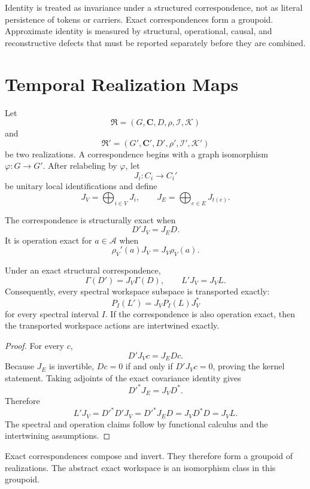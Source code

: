 Identity is treated as invariance under a structured correspondence, not as
literal persistence of tokens or carriers. Exact correspondences form a
groupoid. Approximate identity is measured by structural, operational,
causal, and reconstructive defects that must be reported separately before
they are combined.

\section{Temporal Realization Maps}

Let
\[
\mathfrak R=(G,\mathbf C,D,\rho,\mathcal I,\mathcal K)
\]
and
\[
\mathfrak R'=(G',\mathbf C',D',\rho',\mathcal I',\mathcal K')
\]
be two realizations. A correspondence begins with a graph isomorphism
\(\varphi:G\to G'\). After relabeling by \(\varphi\), let
\[
J_i:C_i\to C_i'
\]
be unitary local identifications and define
\[
J_V=\bigoplus_{i\in V}J_i,
\qquad
J_E=\bigoplus_{e\in E}J_{t(e)}.
\]

\begin{SRWTdefinition}\label{SRWT:def:exact-structural-correspondence}
The correspondence is structurally exact when
\[
\boxed{D'J_V=J_ED.}
\]
It is operation exact for \(a\in\mathcal A\) when
\[
\boxed{\rho_V'(a)J_V=J_V\rho_V(a).}
\]
\end{SRWTdefinition}

\begin{SRWTtheorem}\label{SRWT:thm:exact-replacement-isomorphism}
Under an exact structural correspondence,
\[
\boxed{
\Gamma(D')=J_V\Gamma(D),
\qquad
L'J_V=J_VL.
}
\]
Consequently, every spectral workspace subspace is transported exactly:
\[
P_I(L')=J_VP_I(L)J_V^*
\]
for every spectral interval \(I\). If the correspondence is also operation
exact, then the transported workspace actions are intertwined exactly.
\end{SRWTtheorem}

\begin{proof}
For every \(c\),
\[
D'J_Vc=J_EDc.
\]
Because \(J_E\) is invertible, \(Dc=0\) if and only if \(D'J_Vc=0\), proving
the kernel statement. Taking adjoints of the exact covariance identity gives
\[
D'^*J_E=J_VD^*.
\]
Therefore
\[
L'J_V=D'^*D'J_V=D'^*J_ED=J_VD^*D=J_VL.
\]
The spectral and operation claims follow by functional calculus and the
intertwining assumptions.
\end{proof}

Exact correspondences compose and invert. They therefore form a groupoid of
realizations. The abstract exact workspace is an isomorphism class in this
groupoid.

